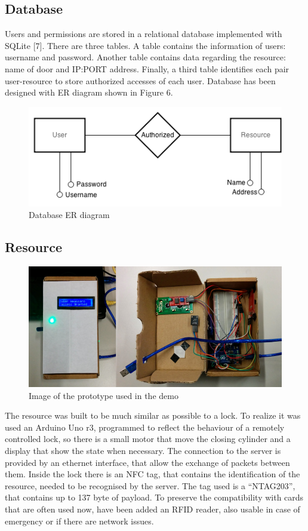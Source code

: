 \documentclass[conference]{IEEEtran}
\begin{document}
\subsection{Database}

Users and permissions are stored in a relational database implemented with SQLite [7]. There are three tables. A table contains the information of users: username and password. Another table contains data regarding the resource: name of door and IP:PORT address.
Finally, a third table identifies each pair user-resource to store authorized accesses of each user.
Database has been designed with ER diagram shown in Figure 6.

\begin{figure}[h]
\centering
\includegraphics[scale=0.5]{fig6}
\caption{Database ER diagram}
\label{db_ER}
\end{figure}

\subsection{Resource}

\begin{figure}[h]
\centering
\includegraphics[scale=0.3]{resource}
\caption{Image of the prototype used in the demo}
\label{resource}
\end{figure}

The resource was built to be much similar as possible to a lock. To realize it was used an Arduino Uno r3, programmed to reflect the behaviour of a remotely controlled lock, so there is a small motor that move the closing cylinder and a display that show the state when necessary.
The connection to the server is provided by an ethernet interface, that allow the exchange of packets between them. 
Inside the lock there is an NFC tag, that contains the identification of the resource, needed to be recognised by the server. The tag used is a ``NTAG203'', that contains up to 137 byte of payload.
To preserve the compatibility with cards that are often used now, have been added an RFID reader, also usable in case of emergency or if there are network issues.
\end{document}

